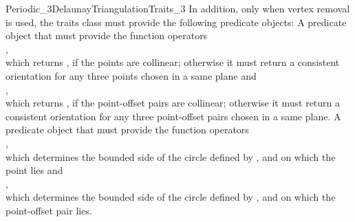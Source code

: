 \begin{ccRefConcept}{Periodic_3DelaunayTriangulationTraits_3}
In addition, only when vertex removal is used, the traits class must
provide the following predicate objects:
{A predicate object that must provide the function operators\\
,\\
which returns , if the points are collinear; otherwise
it must return a consistent orientation for any three points chosen in
a same plane and\\
,\\
which returns , if the point-offset pairs are
collinear; otherwise it must return a consistent orientation for any
three point-offset pairs chosen in a same plane.
}
\ccGlue
{}
{A predicate object that must provide the function operators\\
,\\
which determines the bounded side of the circle defined by ,
and  on which the point  lies and\\
,\\
which determines the bounded side of the circle defined by
, and  on which the point-offset pair
 lies.
 } 


\end{ccRefConcept}
